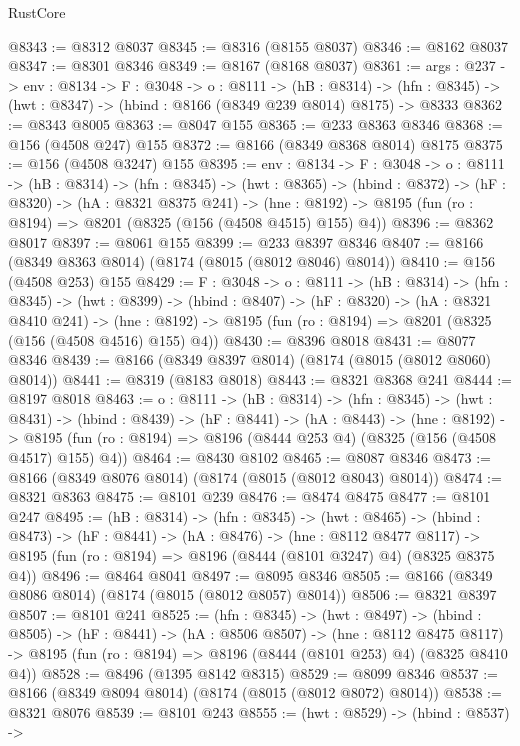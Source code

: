 \begin{lexlean}{RustCore}
\begin{coremodule}
@8343 := @8312 @8037
@8345 := @8316 (@8155 @8037)
@8346 := @8162 @8037
@8347 := @8301 @8346
@8349 := @8167 (@8168 @8037)
@8361 := {args : @237} ->
  {env : @8134} ->
  {F : @3048} ->
  {o : @8111} ->
  (hB : @8314) ->
  (hfn : @8345) -> (hwt : @8347) -> (hbind : @8166 (@8349 @239 @8014) @8175) -> @8333
@8362 := @8343 @8005
@8363 := @8047 @155
@8365 := @233 @8363 @8346
@8368 := @156 (@4508 @247) @155
@8372 := @8166 (@8349 @8368 @8014) @8175
@8375 := @156 (@4508 @3247) @155
@8395 := {env : @8134} ->
  {F : @3048} ->
  {o : @8111} ->
  (hB : @8314) ->
  (hfn : @8345) ->
  (hwt : @8365) ->
  (hbind : @8372) ->
  (hF : @8320) ->
  (hA : @8321 @8375 @241) ->
  (hne : @8192) -> @8195 (fun (ro : @8194) => @8201 (@8325 (@156 (@4508 @4515) @155) @4))
@8396 := @8362 @8017
@8397 := @8061 @155
@8399 := @233 @8397 @8346
@8407 := @8166 (@8349 @8363 @8014) (@8174 (@8015 (@8012 @8046) @8014))
@8410 := @156 (@4508 @253) @155
@8429 := {F : @3048} ->
  {o : @8111} ->
  (hB : @8314) ->
  (hfn : @8345) ->
  (hwt : @8399) ->
  (hbind : @8407) ->
  (hF : @8320) ->
  (hA : @8321 @8410 @241) ->
  (hne : @8192) -> @8195 (fun (ro : @8194) => @8201 (@8325 (@156 (@4508 @4516) @155) @4))
@8430 := @8396 @8018
@8431 := @8077 @8346
@8439 := @8166 (@8349 @8397 @8014) (@8174 (@8015 (@8012 @8060) @8014))
@8441 := @8319 (@8183 @8018)
@8443 := @8321 @8368 @241
@8444 := @8197 @8018
@8463 := {o : @8111} ->
  (hB : @8314) ->
  (hfn : @8345) ->
  (hwt : @8431) ->
  (hbind : @8439) ->
  (hF : @8441) ->
  (hA : @8443) ->
  (hne : @8192) ->
  @8195 (fun (ro : @8194) => @8196 (@8444 @253 @4) (@8325 (@156 (@4508 @4517) @155) @4))
@8464 := @8430 @8102
@8465 := @8087 @8346
@8473 := @8166 (@8349 @8076 @8014) (@8174 (@8015 (@8012 @8043) @8014))
@8474 := @8321 @8363
@8475 := @8101 @239
@8476 := @8474 @8475
@8477 := @8101 @247
@8495 := (hB : @8314) ->
  (hfn : @8345) ->
  (hwt : @8465) ->
  (hbind : @8473) ->
  (hF : @8441) ->
  (hA : @8476) ->
  (hne : @8112 @8477 @8117) ->
  @8195 (fun (ro : @8194) => @8196 (@8444 (@8101 @3247) @4) (@8325 @8375 @4))
@8496 := @8464 @8041
@8497 := @8095 @8346
@8505 := @8166 (@8349 @8086 @8014) (@8174 (@8015 (@8012 @8057) @8014))
@8506 := @8321 @8397
@8507 := @8101 @241
@8525 := (hfn : @8345) ->
  (hwt : @8497) ->
  (hbind : @8505) ->
  (hF : @8441) ->
  (hA : @8506 @8507) ->
  (hne : @8112 @8475 @8117) ->
  @8195 (fun (ro : @8194) => @8196 (@8444 (@8101 @253) @4) (@8325 @8410 @4))
@8528 := @8496 (@1395 @8142 @8315)
@8529 := @8099 @8346
@8537 := @8166 (@8349 @8094 @8014) (@8174 (@8015 (@8012 @8072) @8014))
@8538 := @8321 @8076
@8539 := @8101 @243
@8555 := (hwt : @8529) ->
  (hbind : @8537) ->

\end{coremodule}
\end{lexlean}
